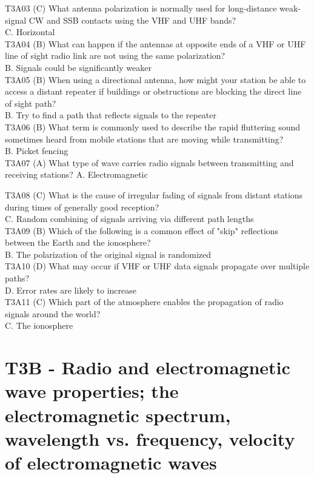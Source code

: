 \documentclass[12pt,letterpaper]{report}
\begin{document}
T3A03 (C) What antenna polarization is normally used for long-distance weak-signal CW and SSB contacts using the VHF and UHF bands?\\
C. Horizontal\\

T3A04 (B) What can happen if the antennas at opposite ends of a VHF or UHF line of sight radio link are not using the same polarization?\\
B. Signals could be significantly weaker\\

T3A05 (B) When using a directional antenna, how might your station be able to access a distant repeater if buildings or obstructions are blocking the direct line of sight path?\\
B. Try to find a path that reflects signals to the repeater\\

T3A06 (B) What term is commonly used to describe the rapid fluttering sound sometimes heard from mobile stations that are moving while transmitting?\\
B. Picket fencing\\

T3A07 (A) What type of wave carries radio signals between transmitting and receiving stations?
A. Electromagnetic

T3A08 (C) What is the cause of irregular fading of signals from distant stations during times of generally good reception?\\
C. Random combining of signals arriving via different path lengths\\

T3A09 (B) Which of the following is a common effect of "skip" reflections between the Earth and the ionosphere?\\
B. The polarization of the original signal is randomized\\

T3A10 (D) What may occur if VHF or UHF data signals propagate over multiple paths?\\
D. Error rates are likely to increase\\

T3A11 (C) Which part of the atmosphere enables the propagation of radio signals around the world?\\
C. The ionosphere\\

\section{T3B - Radio and electromagnetic wave properties; the electromagnetic spectrum, wavelength vs. frequency, velocity of electromagnetic waves}
\end{document}
